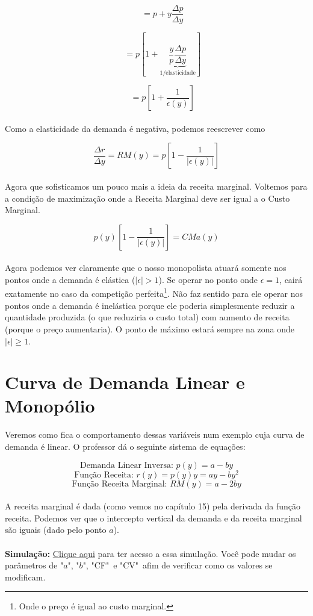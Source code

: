 \documentclass[a4paper,11pt,oneside]{book}
\theoremstyle{definition}
\theoremstyle{break}
\begin{document}
$$ \phantom{\frac{\Delta r}{\Delta y}} = p + y\frac{\Delta p}{\Delta y} $$

$$ \phantom{\frac{\Delta r}{\Delta y}} = 
p \left[ 1 + \underbrace{\frac{y}{p}\frac{\Delta p}{\Delta y}}_\text{1/elasticidade} \right] $$

$$ \phantom{\frac{\Delta r}{\Delta y}} = 
p \left[ 1 + \frac{1}{\epsilon(y)} \right] $$
\\
Como a elasticidade da demanda é negativa, podemos reescrever como

$$ \frac{\Delta r}{\Delta y} = 
RM(y) =
p \left[ 1 - \frac{1}{|\epsilon(y)|} \right] $$
\\
Agora que sofisticamos um pouco mais a ideia da receita marginal. Voltemos para a condição de maximização onde a Receita Marginal deve ser igual a o Custo Marginal.

$$ p(y) \left[ 1 - \frac{1}{|\epsilon(y)|} \right] = CMa(y) $$
\\
Agora podemos ver claramente que o nosso monopolista atuará somente nos pontos onde a demanda é elástica ($|\epsilon| > 1$). Se operar no ponto onde $\epsilon = 1$, cairá exatamente no caso da competição perfeita\footnote{Onde o preço é igual ao custo marginal.}. Não faz sentido para ele operar nos pontos onde a demanda é inelástica porque ele poderia simplesmente reduzir a quantidade produzida (o que reduziria o custo total) com aumento de receita (porque o preço aumentaria). O ponto de máximo estará sempre na zona onde $|\epsilon| \geq 1$.

\section{Curva de Demanda Linear e Monopólio}

Veremos como fica o comportamento dessas variáveis num exemplo cuja curva de demanda é linear. O professor dá o seguinte sistema de equações:

$$ \textrm{Demanda Linear Inversa: } p(y) = a - by $$
$$ \textrm{Função Receita: } r(y) = p(y)y = ay - by^2 $$
$$ \textrm{Função Receita Marginal: } RM(y) = a - 2by $$
\\
A receita marginal é dada (como vemos no capítulo 15) pela derivada da função receita. Podemos ver que o intercepto vertical da demanda e da receita marginal são iguais (dado pelo ponto $a$).
\\
\\
\textbf{Simulação:} \href{https://colab.research.google.com/drive/1OUK3Z--dv7WMufCLmJ9qDWII1yoVlWVX?usp=sharing}{Clique aqui} para ter acesso a essa simulação. Você pode mudar os parâmetros de "$a$", "$b$", "CF"\ e "CV"\ afim de verificar como os valores se modificam.
\end{document}
